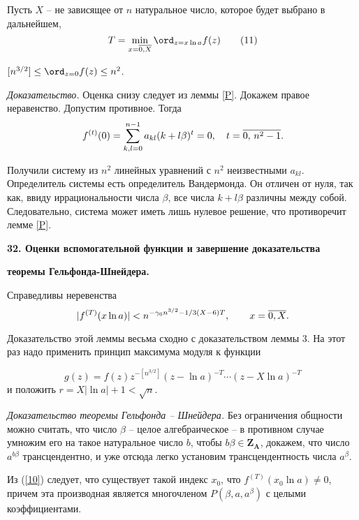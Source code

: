 Пусть $X$  -- не зависящее от $n$ натуральное число, которое будет
выбрано в дальнейшем,
\begin{equation}\label{10}
T=\min_{x=\ol{0,X}}\ord_{z=x \ln a}f(z) \tag {11}
\end{equation}


 \begin{lemma}\label{R}  $[n^{3/2}] \le \ord_{z=0}f(z) \le n^2$.
\end{lemma}

\emph{Доказательство.} Оценка снизу следует из
леммы \ref{P}. Докажем правое неравенство.
Допустим противное. Тогда
$$
f^{(t)}(0)=\sum_{k,l=0}^{n-1}a_{kl}(k+l\beta)^t= 0, \quad t=\overline
{0, \,n^2-1}.
$$

Получили систему из $n^2$ линейных уравнений с
$n^2$  неизвестными $a_{kl}$. Определитель
системы есть определитель Вандермонда. Он отличен
от нуля, так как, ввиду иррациональности числа
$\beta$, все числа $k+l\beta$ различны между
собой. Следовательно, система может иметь лишь
нулевое решение, что противоречит лемме \ref{P}.
%

\vskip 5mm \centerline{\bf { 32. Оценки вспомогательной функции и
завершение доказательства}} \centerline{\bf {теоремы
Гельфонда-Шнейдера. }} \vskip 5mm


\begin{lemma}\label{S}
   Справедливы неревенства
$$
|f^{(T)}(x \ln a)| < n^{-\gamma_6n^{3/2}-1/3(X-6)T}, \qquad
x=\overline{0,X}.
$$

\end{lemma}

 Доказательство этой леммы весьма сходно с
доказательством леммы 3. На этот раз надо
применить принцип максимума модуля к функции

$$
g(z)=f(z)z^{-[n^{3/2}]}(z-\ln a)^{-T} \cdots (z-X\ln a)^{-T}
$$
и положить $r=X|\ln a|+1<\sqrt n$.
%


\emph{Доказательство теоремы Гельфонда --
Шнейдера. } Без ограничения общности можно
считать, что число $\beta$ -- целое
алгебраическое -- в противном случае умножим его
на такое натуральное число $b$,  чтобы $b\beta
\in\mathbf Z_{\mathbf A}$, докажем, что число
$a^{b\beta}$ трансцендентно, и уже отсюда легко
установим трансцендентность числа $a^{\beta}$.

 Из (\ref{10}) следует, что существует
такой индекс $x_0$, что $f^{(T)}(x_0\ln a) \ne 0$, причем эта
производная является многочленом $P(\beta, a, a^{\beta})$ с целыми
коэффициентами.

